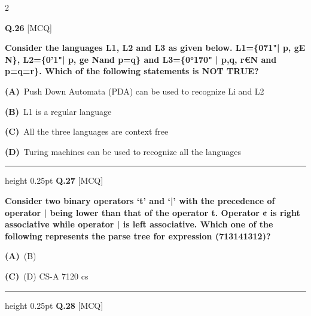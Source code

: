 \documentclass[a4paper,10pt,twoside]{article}
\begin{document}
\begin{multicols}{2}
\vspace{6pt}
\vspace{3pt}

\noindent\textbf{Q.26} \hfill {\footnotesize\textsf{[MCQ]}}
\par\vspace{2pt}
{\bfseries Consider the languages L1, L2 and L3 as given below.
L1=\{071"| p, gE N\},
L2=\{0'1"| p, ge Nand p=q\} and
L3=\{0°170" | p,q, r€N and p=q=r\}. Which of the following statements is NOT TRUE? \par}
\par\vspace{2pt}\noindent
\textbf{(A)}~Push Down Automata (PDA) can be used to recognize Li and L2\par\vspace{2pt}\noindent
\textbf{(B)}~L1 is a regular language\par\vspace{2pt}\noindent
\textbf{(C)}~All the three languages are context free\par\vspace{2pt}\noindent
\textbf{(D)}~Turing machines can be used to recognize all the languages
\par\vspace{6pt}\hrule height 0.25pt\vspace{6pt}
\noindent\textbf{Q.27} \hfill {\footnotesize\textsf{[MCQ]}}
\par\vspace{2pt}
{\bfseries Consider two binary operators `t' and `|' with the precedence of operator | being lower than that
of the operator t. Operator ¢ is right associative while operator | is left associative. Which one of
the following represents the parse tree for expression (713141312)? \par}
\par\vspace{2pt}\noindent
\textbf{(A)}~(B)\par\vspace{2pt}\noindent
\textbf{(C)}~(D) \newline CS-A 7120  cs
\par\vspace{6pt}\hrule height 0.25pt\vspace{6pt}
\noindent\textbf{Q.28} \hfill {\footnotesize\textsf{[MCQ]}}
\par\vspace{2pt}

\end{multicols}
\end{document}
